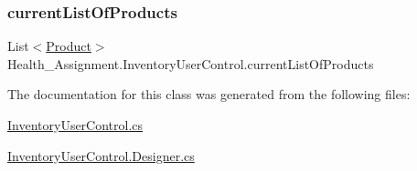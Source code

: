 \mbox{\label{class_health___assignment_1_1_inventory_user_control_a069631cd36efe9353bc8ccb6269feb3f}} 
\subsubsection{\texorpdfstring{current\+List\+Of\+Products}{currentListOfProducts}}
{\footnotesize\ttfamily List$<$\hyperlink{class_health___assignment_1_1_product}{Product}$>$ Health\+\_\+\+Assignment.\+Inventory\+User\+Control.\+current\+List\+Of\+Products}



The documentation for this class was generated from the following files\+:\begin{DoxyCompactItemize}
\item 
\hyperlink{_inventory_user_control_8cs}{Inventory\+User\+Control.\+cs}\item 
\hyperlink{_inventory_user_control_8_designer_8cs}{Inventory\+User\+Control.\+Designer.\+cs}\end{DoxyCompactItemize}
